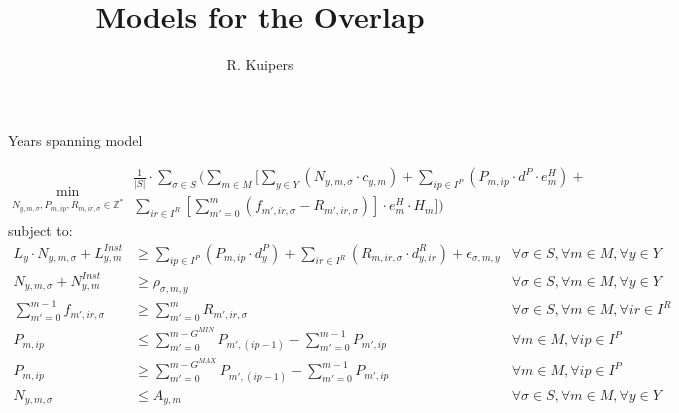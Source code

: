 \documentclass{beamer}
\title[Models for the Overlap]{Models for the Overlap}
\author{R. Kuipers}
\newcommand{\smalld}{\tiny}
\begin{document}

\begin{frame}{Years spanning model}
\smalld

\begin{equation}
	\min_{N_{y,m,\sigma}, P_{m,ip}, R_{m,ir,\sigma} \in \mathbb{Z}^*}
	\begin{aligned}
	\frac{1}{|S|} \cdot \sum_{\sigma \in S} ( \sum_{m \in M} [\sum_{y \in Y} 
	(N_{y,m,\sigma} \cdot c_{y,m}) +  
	\sum_{ip \in I^P} (P_{m,ip} \cdot d^P \cdot e^H_m) + \\
	\sum_{ir \in I^R}[\sum_{m' = 0}^{m} (f_{m',ir,\sigma} - R_{m',ir,\sigma})] \cdot e^H_m \cdot H_m ])
	\end{aligned}	
\end{equation}
subject to:
\begin{align}
L_y \cdot N_{y,m,\sigma} + L^{Inst}_{y,m}	&\geq 	\sum_{ip \in I^P} (P_{m,ip} \cdot d^P_y) + \sum_{ir \in I^R} (R_{m,ir,\sigma} \cdot d^R_{y,ir}) +  \epsilon_{\sigma, m, y} 	
																				& \forall \sigma \in S, \forall m \in M, \forall y \in Y 	\\
N_{y,m,\sigma} + N^{Inst}_{y,m}	&\geq 	\rho_{ \sigma, m, y}									& \forall \sigma \in S, \forall m \in M, \forall y \in Y 	\\
\sum_{m' = 0}^{m-1} f_{m',ir,\sigma}	&\geq 	\sum_{m' = 0}^m R_{m',ir,\sigma}							& \forall \sigma \in S, \forall m \in M, \forall ir \in I^R	\\
P_{m,ip} 					&\leq 		\sum_{m' = 0}^{m-G^{MIN}} P_{m',(ip-1)} - \sum_{m' = 0}^{m-1} P_{m',ip}	& \forall m \in M, \forall ip \in I^P 			\\
P_{m,ip} 					&\geq	 	\sum_{m' = 0}^{m-G^{MAX}} P_{m',(ip-1)} - \sum_{m' = 0}^{m-1} P_{m',ip}	& \forall m \in M, \forall ip \in I^P 			\\
N_{y,m,\sigma}				&\leq		A_{y,m} 											& \forall \sigma \in S, \forall m \in M, \forall y \in Y
\end{align}

\end{frame}
\end{document}
